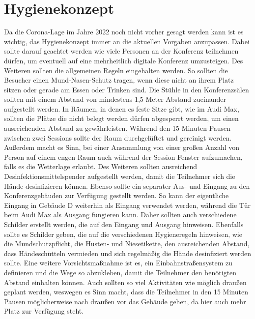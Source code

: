 \section{Hygienekonzept}
Da die Corona-Lage im Jahre 2022 noch nicht vorher gesagt werden kann ist es wichtig, das Hygienekonzept immer an die aktuellen Vorgaben anzupassen. Dabei sollte darauf geachtet werden wie viele Personen an der Konferenz teilnehmen dürfen, um eventuell auf eine mehrheitlich digitale Konferenz umzusteigen. Des Weiteren sollten die allgemeinen Regeln eingehalten werden. So sollten die Besucher einen Mund-Nasen-Schutz tragen, wenn diese nicht an ihrem Platz sitzen oder gerade am Essen oder Trinken sind. Die Stühle in den Konferenzsälen sollten mit einem Abstand von mindestens 1,5 Meter Abstand zueinander aufgestellt werden. In Räumen, in denen es feste Sitze gibt, wie im Audi Max, sollten die Plätze die nicht belegt werden dürfen abgesperrt werden, um einen ausreichenden Abstand zu gewährleisten. Während den 15 Minuten Pausen zwischen zwei Sessions sollte der Raum durchgelüftet und gereinigt werden. Außerdem macht es Sinn, bei einer Ansammlung von einer großen Anzahl von Person auf einem engen Raum auch während der Session Fenster aufzumachen, falls es die Wetterlage erlaubt. Des Weiteren sollten ausreichend Desinfektionsmittelspender aufgestellt werden, damit die Teilnehmer sich die Hände desinfizieren können. Ebenso sollte ein separater Aus- und Eingang zu den Konferenzgebäuden zur Verfügung gestellt werden. So kann der eigentliche Eingang in Gebäude D weiterhin als Eingang verwendet werden, während die Tür beim Audi Max als Ausgang fungieren kann. Daher sollten auch verschiedene Schilder erstellt werden, die auf den Eingang und Ausgang hinweisen. Ebenfalls sollte es Schilder geben, die auf die verschiedenen Hygieneregeln hinweisen, wie die Mundschutzpflicht, die Husten- und Niesetikette, den ausreichenden Abstand, dass Händeschütteln vermieden und sich regelmäßig die Hände desinfiziert werden sollte. Eine weitere Vorsichtsmaßnahme ist es, ein Einbahnstraßensystem zu definieren und die Wege so abzukleben, damit die Teilnehmer den benötigten Abstand einhalten können. Auch sollten so viel Aktivitäten wie möglich draußen geplant werden, weswegen es Sinn macht, dass die Teilnehmer in den 15 Minuten Pausen möglicherweise nach draußen vor das Gebäude gehen, da hier auch mehr Platz zur Verfügung steht. 

